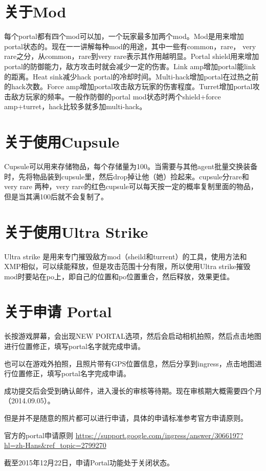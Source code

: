 \documentclass[12pt]{article}
\theoremstyle{definition}
\theoremstyle{remark}
\numberwithin{equation}{section}
\begin{document}
\section{关于Mod}
每个portal都有四个mod可以加，一个玩家最多加两个mod。Mod是用来增加portal状态的。现在一一讲解每种mod的用途，其中一些有common，rare， very rare之分，从common，rare到very rare表示其作用越明显。Portal shield用来增加portal的防御能力，敌方攻击时就会减少一定的伤害。Link amp增加portal能link的距离。Heat sink减少hack portal的冷却时间。Multi-hack增加portal在过热之前的hack次数。Force amp增加portal攻击敌方玩家的伤害程度。Turret增加portal攻击敌方玩家的频率。一般作防御的portal mod状态时两个shield+force amp+turret，hack比较多就多加multi-hack。

\section{关于使用Cupsule}
Cupsule可以用来存储物品，每个存储量为100。当需要与其他agent批量交换装备时，先将物品装到cupsule里，然后drop掉让他（她）捡起来。cupsule分rare和very rare 两种，very rare的红色cupsule可以每天按一定的概率复制里面的物品，但是当其满100后就不会复制了。

\section{关于使用Ultra Strike}
Ultra strike 是用来专门摧毁敌方mod（sheild和turrent）的工具，使用方法和XMP相似，可以续能释放，但是攻击范围十分有限，所以使用Ultra strike摧毁mod时要站在po上，即自己的位置和po位置重合，然后释放，效果更佳。

\section{关于申请 Portal}
长按游戏屏幕，会出现NEW PORTAL选项，然后会启动相机拍照，然后点击地图进行位置修正，填写portal名字就完成申请。\par
也可以在游戏外拍照，且照片带有GPS位置信息，然后分享到ingress，点击地图进行位置修正，填写portal名字完成申请。\par
成功提交后会受到确认邮件，进入漫长的审核等待期。现在审核期大概需要四个月（2014.09.05）。\par
但是并不是随意的照片都可以进行申请，具体的申请标准参考官方申请原则。\par
官方的portal申请原则
\url{https://support.google.com/ingress/answer/3066197?hl=zh-Hans&ref_topic=2799270} \par
\large{截至2015年12月22日，申请Portal功能处于关闭状态。}
\end{document}
